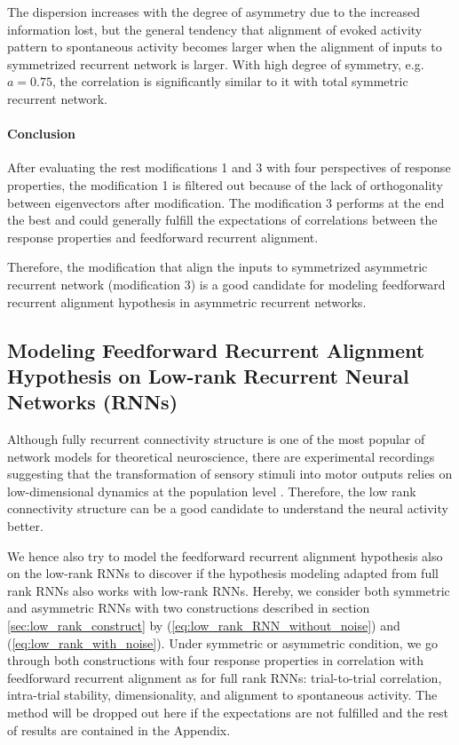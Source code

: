 \documentclass[11pt]{article}
\begin{document}
	The dispersion increases with the degree of asymmetry due to the increased information lost, but the general tendency that alignment of evoked activity pattern to spontaneous activity becomes larger when the alignment of inputs to symmetrized recurrent network is larger. With high degree of symmetry, e.g. $a = 0.75$, the correlation is significantly similar to it with total symmetric recurrent network.
	\vspace{0.5cm}
	\paragraph{Conclusion}
	After evaluating the rest modifications 1 and 3 with four perspectives of response properties, the modification 1 is filtered out because of the lack of orthogonality between eigenvectors after modification. The modification 3 performs at the end the best and could generally fulfill the expectations of correlations between the response properties and feedforward recurrent alignment. 
	
	Therefore, the modification that align the inputs to symmetrized asymmetric recurrent network (modification 3) is a good candidate for modeling feedforward recurrent alignment hypothesis in asymmetric recurrent networks.
	
	\clearpage
	\subsection{Modeling Feedforward Recurrent Alignment Hypothesis on Low-rank Recurrent Neural Networks (RNNs)}
	Although fully recurrent connectivity structure is one of the most popular of network models for theoretical neuroscience, there are experimental recordings suggesting that the transformation of sensory stimuli into motor outputs relies on low-dimensional dynamics at the population level \cite{mastrogiuseppe2018linking}. Therefore, the low rank connectivity structure can be a good candidate to understand the neural activity better. 
	
	We hence also try to model the feedforward recurrent alignment hypothesis also on the low-rank RNNs to discover if the hypothesis modeling adapted from full rank RNNs also works with low-rank RNNs. 
	Hereby, we consider both symmetric and asymmetric RNNs with two constructions described in section \ref{sec:low_rank_construct} by (\ref{eq:low_rank_RNN_without_noise}) and (\ref{eq:low_rank_with_noise}). Under symmetric or asymmetric condition, we go through both constructions with four response properties in correlation with feedforward recurrent alignment as for full rank RNNs: trial-to-trial correlation, intra-trial stability, dimensionality, and alignment to spontaneous activity. The method will be dropped out here if the expectations are not fulfilled and the rest of results are contained in the Appendix. %
	
\end{document}
